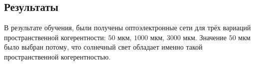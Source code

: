 \subsection{Результаты}
В результате обучения, были получены оптоэлектронные сети для трёх вариаций пространственной когерентности: $50$ мкм, $1000$ мкм, $3000$ мкм. Значение $50$ мкм было выбран потому, что солнечный свет обладает именно такой пространственной когерентностью.